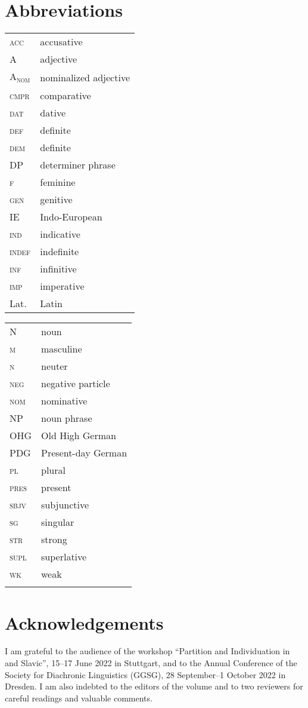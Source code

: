\documentclass[output=paper,colorlinks,citecolor=brown]{langscibook}
\begin{document}
\section*{Abbreviations}
\begin{tabularx}{.5\textwidth}{@{}lQ}
\textsc{acc} & accusative\\
A & {adjective} \\
A\textsubscript{\textsc{nom}} & nominalized {adjective} \\
\textsc{cmpr} & {comparative} \\
\textsc{dat} & {dative} \\
\textsc{def} & definite \\
\textsc{dem} & definite \\
DP & {determiner} phrase \\
\textsc{f} & feminine\\
\textsc{gen} & {genitive}\\
IE & {Indo-European} \\
\textsc{ind} & indicative \\
\textsc{indef} & {indefinite} \\
\textsc{inf} & infinitive\\
\textsc{imp} & imperative\\
Lat. & {Latin} \\
\end{tabularx}%
\begin{tabularx}{.5\textwidth}{lQ@{}}
N & {noun} \\
\textsc{m} & masculine \\
\textsc{n} & neuter\\
\textsc{neg} & negative particle \\
\textsc{nom} & {nominative}\\
NP & {noun} phrase\\
OHG & Old High {German} \\
PDG & Present-day {German} \\
\textsc{pl} & plural \\
\textsc{pres} & present \\
\textsc{sbjv} & subjunctive \\
\textsc{sg} & singular \\
\textsc{str} & strong\\
\textsc{supl} & {superlative} \\
\textsc{wk} & weak \\
& \\
\end{tabularx}

\section*{Acknowledgements}
I am grateful to the audience of the workshop “Partition and Individuation in  and Slavic”, 15--17 June 2022 in Stuttgart, and to the Annual Conference of the  Society for  Diachronic Linguistics (GGSG), 28 September--1 October 2022 in Dresden. I am also indebted to the editors of the volume and to two reviewers for careful readings and valuable comments.

{\sloppy\printbibliography[heading=subbibliography,notkeyword=this]}
\end{document}
